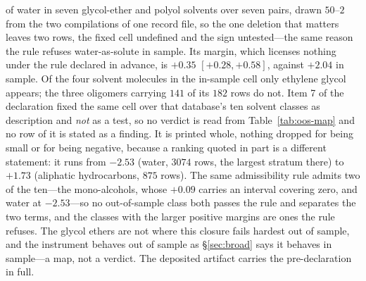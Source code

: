 of water in seven glycol-ether and polyol solvents over seven pairs, drawn $50$--$2$ from the two
compilations of one record file, so the one deletion that matters leaves two rows, the fixed cell undefined and the
sign untested---the same reason the rule refuses water-as-solute in sample. Its margin, which
licenses nothing under the rule declared in advance, is $+0.35$ $[+0.28,+0.58]$, against $+2.04$ in
sample. Of the four solvent molecules in the in-sample cell only ethylene glycol appears; the three
oligomers carrying $141$ of its $182$ rows do not. Item 7 of the declaration fixed the same cell
over that database's ten solvent classes as description and \emph{not} as a test, so no verdict is
read from Table~\ref{tab:oos-map} and no row of it is stated as a finding. It is printed whole,
nothing dropped for being small or for being negative, because a ranking quoted in part is a
different statement:
it runs from $-2.53$ (water, $3074$ rows, the largest stratum there) to $+1.73$ (aliphatic
hydrocarbons, $875$ rows). The same admissibility rule admits two of the ten---the mono-alcohols,
whose $+0.09$ carries an interval covering zero, and water at $-2.53$---so no out-of-sample class
both passes the rule and separates the two terms, and the classes with the larger positive margins
are ones the rule refuses. The glycol ethers are not where this
closure fails hardest out of sample, and the instrument behaves out of sample as
\S\ref{sec:broad} says it behaves in sample---a map, not a verdict. The deposited artifact
carries the pre-declaration in full.

